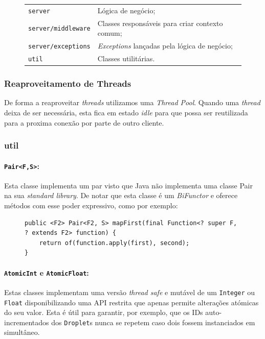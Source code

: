 \documentclass[a4paper]{article}
\begin{document}
\begin{figure}[H]
\centering
    \begin{tabular}{ll}
        \texttt{server}            & Lógica de negócio;\\
        \texttt{server/middleware} & Classes responsáveis para criar contexto comum;\\
        \texttt{server/exceptions} & \textit{Exceptions} lançadas pela lógica de negócio;\\
        \texttt{util}              & Classes utilitárias.
    \end{tabular}
\end{figure}

\subsubsection{Reaproveitamento de Threads}
De forma a reaproveitar \textit{threads} utilizamos uma \textit{Thread Pool}. Quando uma \textit{thread} deixa de ser necessária, esta fica em estado \textit{idle} para que possa ser reutilizada para a proxima conexão por parte de outro cliente.

\subsubsection{util}
\paragraph{\texttt{Pair<F,S>}:}

Esta classe implementa um par visto que Java não implementa uma classe Pair na sua \textit{standard library}. De notar que esta classe é um \textit{BiFunctor} e oferece métodos com esse poder expressivo, como por exemplo:
\begin{figure}[H]
    \begin{verbatim}
public <F2> Pair<F2, S> mapFirst(final Function<? super F, ? extends F2> function) {
    return of(function.apply(first), second);
}
    \end{verbatim}
\end{figure}

\paragraph{\texttt{AtomicInt} e \texttt{AtomicFloat}:}

Estas classes implementam uma versão \textit{thread safe} e mutável de um \texttt{Integer} ou \texttt{Float} disponibilizando uma API restrita que apenas permite alterações atómicas do seu valor. Esta é útil para garantir, por exemplo,  que os IDs auto-incrementados dos \texttt{Droplet}s nunca se repetem  caso dois fossem instanciados em simultâneo.
\end{document}
